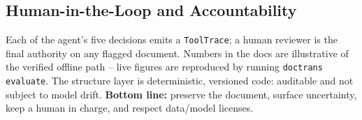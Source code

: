 \documentclass[12pt,a4paper]{article}
\begin{document}
\subsection{Human-in-the-Loop and Accountability}

Each of the agent's five decisions emits a \texttt{ToolTrace}; a human reviewer is the final authority on any flagged document. Numbers in the docs are illustrative of the verified offline path -- live figures are reproduced by running \texttt{doctrans evaluate}. The structure layer is deterministic, versioned code: auditable and not subject to model drift. \textbf{Bottom line:} preserve the document, surface uncertainty, keep a human in charge, and respect data/model licenses.
\end{document}
